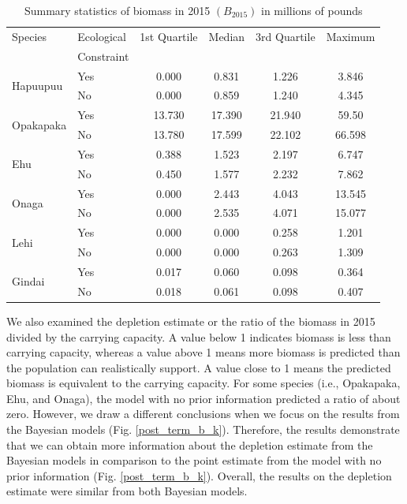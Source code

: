 \documentclass[oneside,12pt,final]{sty/ucthesis-CA2012}
\begin{document}
\begin{mainmatter}
\begin{table}[H]
\centering
\caption{Summary statistics of biomass in 2015 $(B_{2015})$ in millions of pounds}
\begin{tabular}{llcccc}
  \hline 
 Species & Ecological  &  1st Quartile &  Median   & 3rd Quartile  &  Maximum \\
 & Constraint &&&&\\ 
   \hline
\multirow{2}{*}{Hapuupuu} & Yes    & 0.000   & 0.831   &  1.226   & 3.846
 \\
 						  & No  &  0.000   & 0.859     & 1.240  &  4.345
 \\
   \hline
\multirow{2}{*}{Opakapaka}& Yes    & 13.730  &  17.390   &  21.940  &  59.50 
 \\
						  & No  &  13.780   & 17.599  &   22.102  & 66.598 
 \\
   \hline
\multirow{2}{*}{Ehu}  & Yes  & 0.388   &  1.523    &   2.197  & 6.747 
 \\
					  & No   &  0.450  &  1.577   &   2.232  &  7.862
 \\
   \hline
\multirow{2}{*}{Onaga} & Yes  & 0.000   &  2.443      &  4.043  & 13.545  
 \\
					   & No &   0.000 &    2.535     &  4.071 & 15.077
 \\
   \hline
\multirow{2}{*}{Lehi}  & Yes   & 0.000   & 0.000   &  0.258 & 1.201 
 \\
					   & No  & 0.000  &  0.000    &  0.263  & 1.309
\\
   \hline
\multirow{2}{*}{Gindai} & Yes &  0.017  & 0.060  &  0.098 & 0.364
 \\
						& No  & 0.018 &  0.061 &  0.098 & 0.407 
 \\
   \hline
\end{tabular} 
\label{summary_term_bio}
\end{table}
 
 We also examined the depletion estimate or the ratio of the biomass in 2015 divided by the carrying capacity. A value below 1 indicates biomass is less than carrying capacity, whereas a value above 1 means more biomass is predicted than the population can realistically support. A value close to 1 means the predicted biomass is equivalent to the carrying capacity. For some species (i.e., Opakapaka, Ehu, and Onaga), the model with no prior information predicted a ratio of about zero. However, we draw a different conclusions when we focus on the results from the Bayesian models (Fig. \ref{post_term_b_k}). Therefore, the results demonstrate that we can obtain more information about the depletion estimate from the Bayesian models in comparison to the point estimate from the model with no prior information (Fig. \ref{post_term_b_k}). Overall, the results on the depletion estimate were similar from both Bayesian models.
 

\end{mainmatter}
\end{document}
